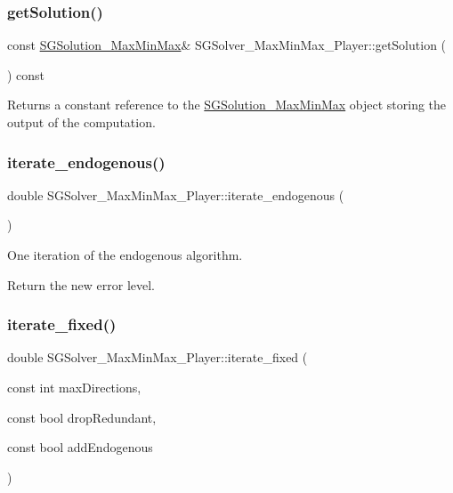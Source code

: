 \subsubsection{\texorpdfstring{get\+Solution()}{getSolution()}}
{\footnotesize\ttfamily const \hyperlink{classSGSolution__MaxMinMax}{S\+G\+Solution\+\_\+\+Max\+Min\+Max}\& S\+G\+Solver\+\_\+\+Max\+Min\+Max\+\_\+Player\+::get\+Solution (\begin{DoxyParamCaption}{ }\end{DoxyParamCaption}) const\hspace{0.3cm}{\ttfamily [inline]}}

Returns a constant reference to the \hyperlink{classSGSolution__MaxMinMax}{S\+G\+Solution\+\_\+\+Max\+Min\+Max} object storing the output of the computation. \mbox{\label{classSGSolver__MaxMinMax__3Player_a51a9f21016a88463930890bd95c0c0de}} 
\subsubsection{\texorpdfstring{iterate\+\_\+endogenous()}{iterate\_endogenous()}}
{\footnotesize\ttfamily double S\+G\+Solver\+\_\+\+Max\+Min\+Max\+\_\+Player\+::iterate\+\_\+endogenous (\begin{DoxyParamCaption}{ }\end{DoxyParamCaption})}



One iteration of the endogenous algorithm. 

Return the new error level. \mbox{\label{classSGSolver__MaxMinMax__3Player_af70c3ae57f9a485f0f66c4dc76eb3bff}} 
\subsubsection{\texorpdfstring{iterate\+\_\+fixed()}{iterate\_fixed()}}
{\footnotesize\ttfamily double S\+G\+Solver\+\_\+\+Max\+Min\+Max\+\_\+Player\+::iterate\+\_\+fixed (\begin{DoxyParamCaption}\item[{const int}]{max\+Directions,  }\item[{const bool}]{drop\+Redundant,  }\item[{const bool}]{add\+Endogenous }\end{DoxyParamCaption})}



